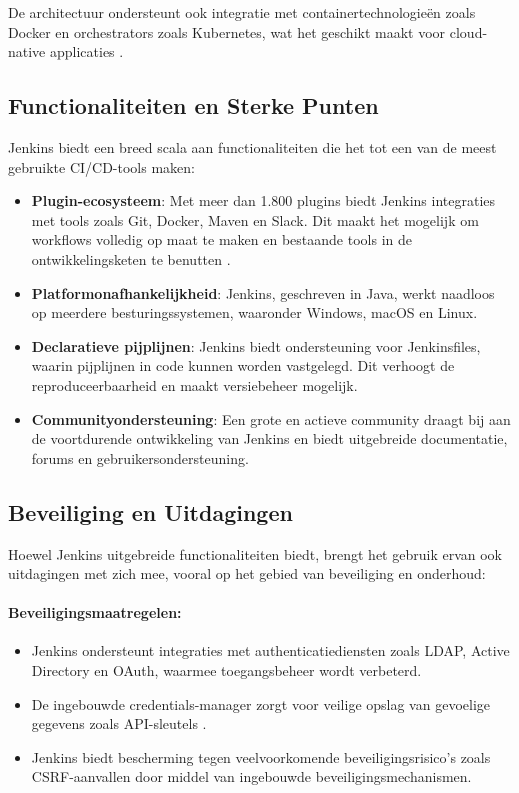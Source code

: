 De architectuur ondersteunt ook integratie met containertechnologieën zoals Docker en orchestrators zoals Kubernetes, wat het geschikt maakt voor cloud-native applicaties \autocite{amaral2021}.

\subsection{Functionaliteiten en Sterke Punten}

Jenkins biedt een breed scala aan functionaliteiten die het tot een van de meest gebruikte CI/CD-tools maken:
\begin{itemize}
    \item \textbf{Plugin-ecosysteem}: Met meer dan 1.800 plugins biedt Jenkins integraties met tools zoals Git, Docker, Maven en Slack. Dit maakt het mogelijk om workflows volledig op maat te maken en bestaande tools in de ontwikkelingsketen te benutten \autocite{shahin2017}.
    \item \textbf{Platformonafhankelijkheid}: Jenkins, geschreven in Java, werkt naadloos op meerdere besturingssystemen, waaronder Windows, macOS en Linux.
    \item \textbf{Declaratieve pijplijnen}: Jenkins biedt ondersteuning voor Jenkinsfiles, waarin pijplijnen in code kunnen worden vastgelegd. Dit verhoogt de reproduceerbaarheid en maakt versiebeheer mogelijk.
    \item \textbf{Communityondersteuning}: Een grote en actieve community draagt bij aan de voortdurende ontwikkeling van Jenkins en biedt uitgebreide documentatie, forums en gebruikersondersteuning.
\end{itemize}

\subsection{Beveiliging en Uitdagingen}

Hoewel Jenkins uitgebreide functionaliteiten biedt, brengt het gebruik ervan ook uitdagingen met zich mee, vooral op het gebied van beveiliging en onderhoud:

\paragraph{Beveiligingsmaatregelen:}
\begin{itemize}
    \item Jenkins ondersteunt integraties met authenticatiediensten zoals LDAP, Active Directory en OAuth, waarmee toegangsbeheer wordt verbeterd.
    \item De ingebouwde credentials-manager zorgt voor veilige opslag van gevoelige gegevens zoals API-sleutels \autocite{amaral2021}.
    \item Jenkins biedt bescherming tegen veelvoorkomende beveiligingsrisico's zoals CSRF-aanvallen door middel van ingebouwde beveiligingsmechanismen.
\end{itemize}

